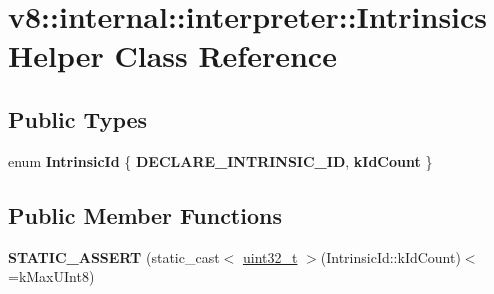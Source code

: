 \hypertarget{classv8_1_1internal_1_1interpreter_1_1IntrinsicsHelper}{}\section{v8\+:\+:internal\+:\+:interpreter\+:\+:Intrinsics\+Helper Class Reference}
\label{classv8_1_1internal_1_1interpreter_1_1IntrinsicsHelper}
\subsection*{Public Types}
\begin{DoxyCompactItemize}
\item 
\mbox{\label{classv8_1_1internal_1_1interpreter_1_1IntrinsicsHelper_a728b05205ff91d883ab2784d8faf41bf}} 
enum {\bfseries Intrinsic\+Id} \{ {\bfseries D\+E\+C\+L\+A\+R\+E\+\_\+\+I\+N\+T\+R\+I\+N\+S\+I\+C\+\_\+\+ID}, 
{\bfseries k\+Id\+Count}
 \}
\end{DoxyCompactItemize}
\subsection*{Public Member Functions}
\begin{DoxyCompactItemize}
\item 
\mbox{\label{classv8_1_1internal_1_1interpreter_1_1IntrinsicsHelper_a4f7f218c32985d8cc65937b8489c2ca5}} 
{\bfseries S\+T\+A\+T\+I\+C\+\_\+\+A\+S\+S\+E\+RT} (static\+\_\+cast$<$ \mbox{\hyperlink{classuint32__t}{uint32\+\_\+t}} $>$(Intrinsic\+Id\+::k\+Id\+Count)$<$=k\+Max\+U\+Int8)
\end{DoxyCompactItemize}
